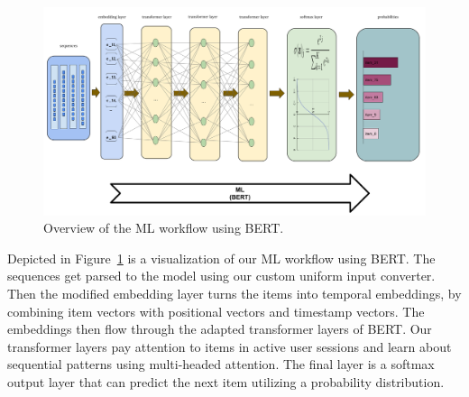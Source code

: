 
\begin{figure}[htbp]
\centering
\includegraphics[width=1\textwidth]{images/diagrams/ML_path.png}
\caption{Overview of the ML workflow using BERT.}
\label{fig:ml_flow}
\end{figure}

Depicted in Figure~\ref{fig:ml_flow} is a visualization of our ML workflow using BERT. The sequences get parsed to the model using our custom uniform input converter. Then the modified embedding layer turns the items into temporal embeddings, by combining item vectors with positional vectors and timestamp vectors. The embeddings then flow through the adapted transformer layers of BERT. Our transformer layers pay attention to items in active user sessions and learn about sequential patterns using multi-headed attention. The final layer is a softmax output layer that can predict the next item utilizing a probability distribution.

% 
% 


